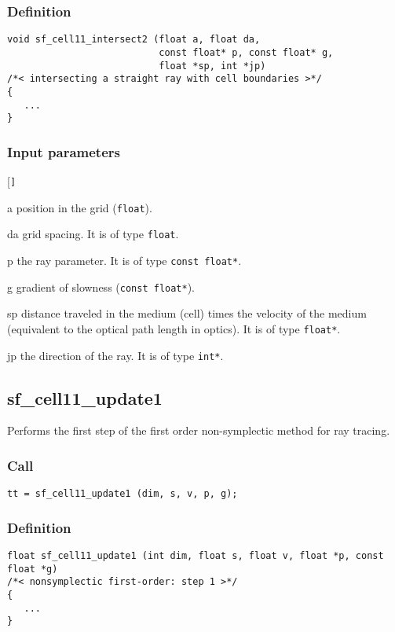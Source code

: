 \subsubsection*{Definition}
\begin{verbatim}
void sf_cell11_intersect2 (float a, float da, 
                           const float* p, const float* g, 
                           float *sp, int *jp)
/*< intersecting a straight ray with cell boundaries >*/
{
   ...
}
\end{verbatim}

\subsubsection*{Input parameters}
\begin{desclist}{\tt }{\quad}[\tt ]
   \setlength\itemsep{0pt}
   \item[a]  position in the grid (\texttt{float}).  
   \item[da] grid spacing. It is of type \texttt{float}.
   \item[p]  the ray parameter. It is of type \texttt{const float*}.
   \item[g]  gradient of slowness (\texttt{const float*}).  
   \item[sp] distance traveled in the medium (cell) times the velocity of the medium (equivalent to the optical path length in optics). It is of type \texttt{float*}.
   \item[jp] the direction of the ray. It is of type \texttt{int*}.
\end{desclist}




\subsection{{sf\_cell11\_update1}}
Performs the first step of the first order non-symplectic method for ray tracing.

\subsubsection*{Call}
\begin{verbatim}tt = sf_cell11_update1 (dim, s, v, p, g);\end{verbatim}

\subsubsection*{Definition}
\begin{verbatim}
float sf_cell11_update1 (int dim, float s, float v, float *p, const float *g) 
/*< nonsymplectic first-order: step 1 >*/
{
   ...
}
\end{verbatim}

